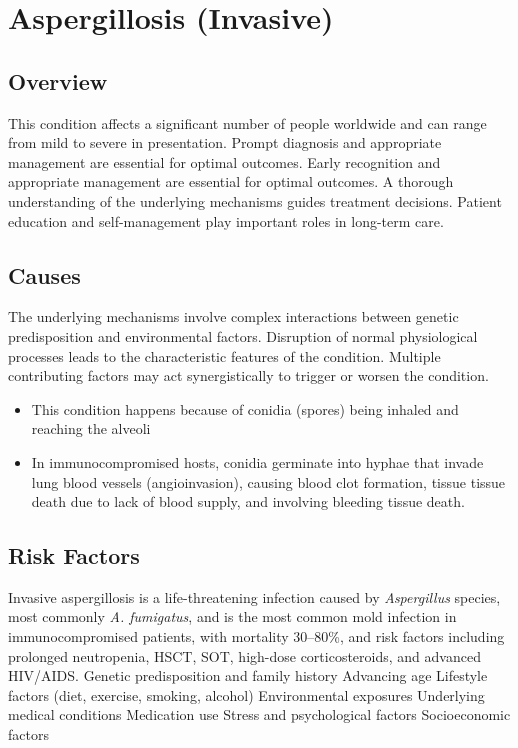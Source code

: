 \chapter{Aspergillosis (Invasive)}
\label{sec:Aspergillosis Invasive}

\section{Overview}
This condition affects a significant number of people worldwide and can range from mild to severe in presentation. Prompt diagnosis and appropriate management are essential for optimal outcomes. Early recognition and appropriate management are essential for optimal outcomes. A thorough understanding of the underlying mechanisms guides treatment decisions. Patient education and self-management play important roles in long-term care.
\section{Causes}
The underlying mechanisms involve complex interactions between genetic predisposition and environmental factors. Disruption of normal physiological processes leads to the characteristic features of the condition. Multiple contributing factors may act synergistically to trigger or worsen the condition.

\begin{itemize}[noitemsep]
  \item This condition happens because of conidia (spores) being inhaled and reaching the alveoli
  \item In immunocompromised hosts, conidia germinate into hyphae that invade lung blood vessels (angioinvasion), causing blood clot formation, tissue tissue death due to lack of blood supply, and involving bleeding tissue death.
\end{itemize}
\section{Risk Factors}
Invasive aspergillosis is a life-threatening infection caused by \textit{Aspergillus} species, most commonly \textit{A. fumigatus}, and is the most common mold infection in immunocompromised patients, with mortality 30--80\%, and risk factors including prolonged neutropenia, HSCT, SOT, high-dose corticosteroids, and advanced HIV/AIDS. Genetic predisposition and family history Advancing age Lifestyle factors (diet, exercise, smoking, alcohol) Environmental exposures Underlying medical conditions Medication use Stress and psychological factors Socioeconomic factors

